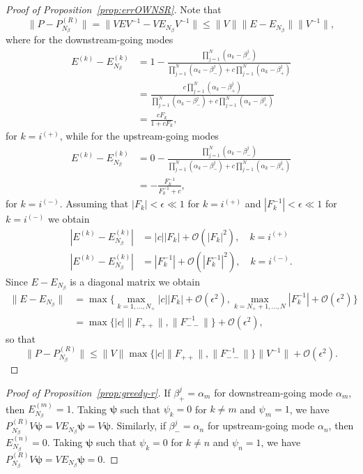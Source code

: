 \begin{proof}[Proof of Proposition~\ref{prop:errOWNSR}]
    Note that
    \[
        \|P-P_{N_\beta}^{(R)}\|
        =\|VEV^{-1}-VE_{N_\beta}V^{-1}\|
        \leq\|V\|\|E-E_{N_\beta}\|\|V^{-1}\|,
    \]
    where for the downstream-going modes
    \begin{align*}
    E^{(k)}-E_{N_\beta}^{(k)}
    &=
    1-\frac{\prod_{j=1}^{N}(\alpha_k-\beta_-^j)}{\prod_{j=1}^{N}(\alpha_k-\beta_-^j)+c\prod_{j=1}^{N}(\alpha_k-\beta_+^j)}\\
    &=
    \frac{c\prod_{j=1}^{N}(\alpha_k-\beta_+^j)}{\prod_{j=1}^{N}(\alpha_k-\beta_-^j)+c\prod_{j=1}^{N}(\alpha_k-\beta_+^j)}\\
    &=
    \frac{c F_k}{1+c F_k},
    \end{align*}
    for $k=i^{(+)}$, while for the upstream-going modes
    \begin{align*}
    E^{(k)}-E_{N_\beta}^{(k)}
    &=
    0-\frac{\prod_{j=1}^{N}(\alpha_k-\beta_-^j)}{\prod_{j=1}^{N}(\alpha_k-\beta_-^j)+c\prod_{j=1}^{N}(\alpha_k-\beta_+^j)}\\
    &=
    -\frac{F_k^{-1}}{F_k^{-1}+c},
    \end{align*}
    for $k=i^{(-)}$. Assuming that $|F_k|<\epsilon\ll1$ for $k=i^{(+)}$ and $|F_k^{-1}|<\epsilon\ll1$ for $k=i^{(-)}$ we obtain
    \begin{align*}
        |E^{(k)}-E_{N_\beta}^{(k)}|&=|c||F_k|+\mathcal{O}(|F_k|^2),\quad k=i^{(+)}\\
        |E^{(k)}-E_{N_\beta}^{(k)}|&=|F_k^{-1}|+\mathcal{O}(|F_k^{-1}|^2),\quad k=i^{(-)}.
    \end{align*}
    Since $E-E_{N_\beta}$ is a diagonal matrix we obtain
    \begin{align*}
    \|E-E_{N_\beta}\|
    &=\max\big\{ \max_{k=1,\dots,N_+}|c||F_k|+\mathcal{O}(\epsilon^2), \max_{k=N_++1,\dots,N}|F_k^{-1}|+\mathcal{O}(\epsilon^2) \big\}\\
    &=\max\big\{ |c|\|F_{++}\|, \|F_{--}^{-1}\| \big\}+\mathcal{O}(\epsilon^2),
    \end{align*}
    so that
    \[
    \|P-P_{N_\beta}^{(R)}\|\leq
    \|V\|\max\big\{ |c|\|F_{++}\|, \|F_{--}^{-1}\| \big\}\|V^{-1}\|+\mathcal{O}(\epsilon^2).
    \]
\end{proof}

\begin{proof}[Proof of Proposition~\ref{prop:greedy-r}]
    If $\beta_+^j=\alpha_m$ for downstream-going mode $\alpha_m$, then $E_{N_\beta}^{(m)}=1$. Taking $\bm{\psi}$ such that $\psi_k=0$ for $k\neq m$ and $\psi_m=1$, we have $P_{N_\beta}^{(R)}V\bm{\psi}=VE_{N_\beta}\bm{\psi}=V\bm{\psi}$. Similarly, if $\beta_-^j=\alpha_n$ for upstream-going mode $\alpha_n$, then $E_{N_\beta}^(n)=0$. Taking $\bm{\psi}$ such that $\psi_k=0$ for $k\neq n$ and $\psi_n=1$, we have $P_{N_\beta}^{(R)}V\bm{\psi}=VE_{N_\beta}\bm{\psi}=0$.
\end{proof}

